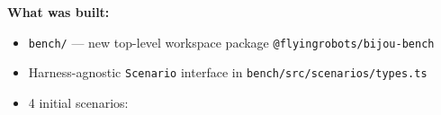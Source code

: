 \textbf{What was built:}

\begin{itemize}
\tightlist
\item
  \texttt{b\allowbreak{}e\allowbreak{}n\allowbreak{}c\allowbreak{}h\allowbreak{}/} --- new top-level workspace package \texttt{@\allowbreak{}f\allowbreak{}l\allowbreak{}y\allowbreak{}i\allowbreak{}n\allowbreak{}g\allowbreak{}r\allowbreak{}o\allowbreak{}b\allowbreak{}o\allowbreak{}t\allowbreak{}s\allowbreak{}/\allowbreak{}b\allowbreak{}i\allowbreak{}j\allowbreak{}o\allowbreak{}u\allowbreak{}-\allowbreak{}b\allowbreak{}e\allowbreak{}n\allowbreak{}c\allowbreak{}h}
\item
  Harness-agnostic \texttt{S\allowbreak{}c\allowbreak{}e\allowbreak{}n\allowbreak{}a\allowbreak{}r\allowbreak{}i\allowbreak{}o} interface in \texttt{b\allowbreak{}e\allowbreak{}n\allowbreak{}c\allowbreak{}h\allowbreak{}/\allowbreak{}s\allowbreak{}r\allowbreak{}c\allowbreak{}/\allowbreak{}s\allowbreak{}c\allowbreak{}e\allowbreak{}n\allowbreak{}a\allowbreak{}r\allowbreak{}i\allowbreak{}o\allowbreak{}s\allowbreak{}/\allowbreak{}t\allowbreak{}y\allowbreak{}p\allowbreak{}e\allowbreak{}s\allowbreak{}.\allowbreak{}t\allowbreak{}s}
\item
  4 initial scenarios:


\end{itemize}
